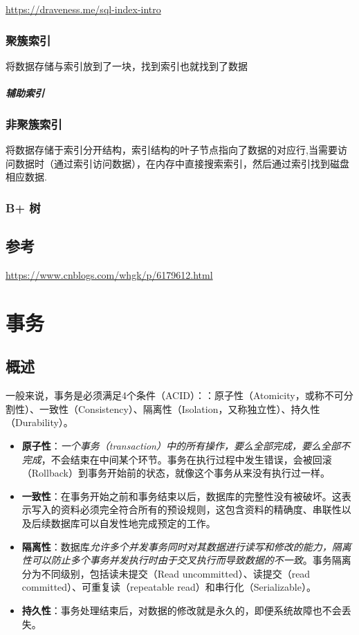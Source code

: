 \documentclass[UTF8,a4paper,12pt]{ctexbook}
\begin{document}
		\url{https://draveness.me/sql-index-intro}
		
		\subsection{聚簇索引}
			将数据存储与索引放到了一块，找到索引也就找到了数据
			
			
			\paragraph{辅助索引}
			
			
			
			
			
			
		\subsection{非聚簇索引}
			将数据存储于索引分开结构，索引结构的叶子节点指向了数据的对应行,当需要访问数据时（通过索引访问数据），在内存中直接搜索索引，然后通过索引找到磁盘相应数据.
		
		\subsection{B+ 树}
		
		
		
	\section{参考}
		\url{https://www.cnblogs.com/whgk/p/6179612.html}
			
	
	
\chapter{事务}
	\section{概述}
		一般来说，事务是必须满足4个条件（ACID）：：原子性（Atomicity，或称不可分割性）、一致性（Consistency）、隔离性（Isolation，又称独立性）、持久性（Durability）。
		
		\begin{itemize}
			\item \textbf{原子性}：\textit{一个事务（transaction）中的所有操作，要么全部完成，要么全部不完成}，不会结束在中间某个环节。事务在执行过程中发生错误，会被回滚（Rollback）到事务开始前的状态，就像这个事务从来没有执行过一样。
			\item \textbf{一致性}：在事务开始之前和事务结束以后，数据库的完整性没有被破坏。这表示写入的资料必须完全符合所有的预设规则，这包含资料的精确度、串联性以及后续数据库可以自发性地完成预定的工作。
			\item \textbf{隔离性}：数据库\textit{允许多个并发事务同时对其数据进行读写和修改的能力，隔离性可以防止多个事务并发执行时由于交叉执行而导致数据的不一致}。事务隔离分为不同级别，包括读未提交（Read uncommitted）、读提交（read committed）、可重复读（repeatable read）和串行化（Serializable）。
			\item \textbf{持久性}：事务处理结束后，对数据的修改就是永久的，即便系统故障也不会丢失。
		\end{itemize}
	
\end{document}
